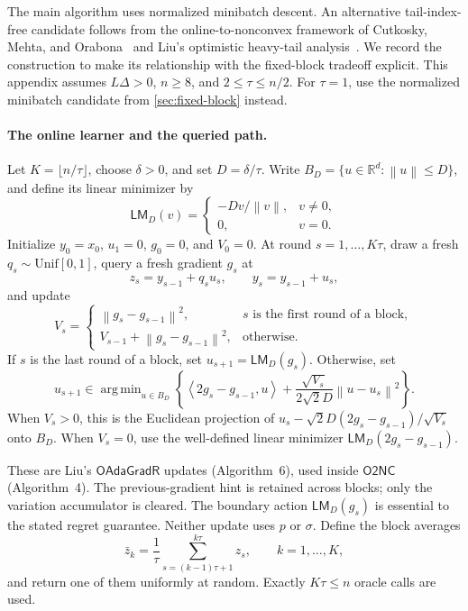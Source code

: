 \documentclass[11pt,a4paper]{article}
\newcommand{\R}{\mathbb{R}}
\newcommand{\norm}[1]{\left\lVert #1\right\rVert}
\newcommand{\inner}[2]{\left\langle #1,#2\right\rangle}
\newcommand{\OtwoNC}{\mathsf{O2NC}}
\newcommand{\OAdaGradR}{\mathsf{OAdaGradR}}
\DeclareMathOperator*{\argmin}{arg\,min}
\theoremstyle{definition}
\theoremstyle{remark}
\begin{document}
The main algorithm uses normalized minibatch descent.  An alternative
tail-index-free candidate follows from the online-to-nonconvex framework of
Cutkosky, Mehta, and Orabona~\cite{cutkosky2023o2nc} and Liu's optimistic
heavy-tail analysis~\cite{liu2026oco}.  We record the construction to make
its relationship with the fixed-block tradeoff explicit.  This appendix
assumes $L\Delta>0$, $n\ge8$, and $2\le\tau\le n/2$.  For $\tau=1$, use
the normalized minibatch candidate from \cref{sec:fixed-block} instead.

\paragraph{The online learner and the queried path.}
Let $K=\lfloor n/\tau\rfloor$, choose $\delta>0$, and set $D=\delta/\tau$.
Write $B_D=\{u\in\R^d:\norm u\le D\}$, and define its linear minimizer by
\[
 \mathsf{LM}_D(v)=
 \begin{cases}
  -Dv/\norm v,&v\ne0,\\
  0,&v=0.
 \end{cases}
\]
Initialize $y_0=x_0$, $u_1=0$, $g_0=0$, and $V_0=0$.
At round $s=1,\ldots,K\tau$, draw a fresh $q_s\sim\mathrm{Unif}[0,1]$,
query a fresh gradient $g_s$ at
\[
 z_s=y_{s-1}+q_su_s,
 \qquad y_s=y_{s-1}+u_s,
\]
and update
\[
 V_s=
 \begin{cases}
  \norm{g_s-g_{s-1}}^2,&\text{$s$ is the first round of a block},\\
  V_{s-1}+\norm{g_s-g_{s-1}}^2,&\text{otherwise}.
 \end{cases}
\]
If $s$ is the last round of a block, set $u_{s+1}=\mathsf{LM}_D(g_s)$.
Otherwise, set
\begin{equation}\label{eq:o2nc-online-update}
 u_{s+1}\in\argmin_{u\in B_D}
 \left\{\inner{2g_s-g_{s-1}}{u}
       +\frac{\sqrt{V_s}}{2\sqrt2D}\norm{u-u_s}^2\right\}.
\end{equation}
When $V_s>0$, this is the Euclidean projection of
$u_s-\sqrt2D(2g_s-g_{s-1})/\sqrt{V_s}$ onto $B_D$.
When $V_s=0$, use the well-defined linear minimizer
$\mathsf{LM}_D(2g_s-g_{s-1})$.

These are Liu's $\OAdaGradR$ updates (Algorithm~6), used inside $\OtwoNC$
(Algorithm~4).  The previous-gradient hint is retained across blocks;
only the variation accumulator is cleared.  The boundary action
$\mathsf{LM}_D(g_s)$ is essential to the stated regret guarantee.
Neither update uses $p$ or $\sigma$.
Define the block averages
\[
 \bar z_k=\frac1\tau\sum_{s=(k-1)\tau+1}^{k\tau}z_s,
 \qquad k=1,\ldots,K,
\]
and return one of them uniformly at random.  Exactly $K\tau\le n$
oracle calls are used.
\end{document}
